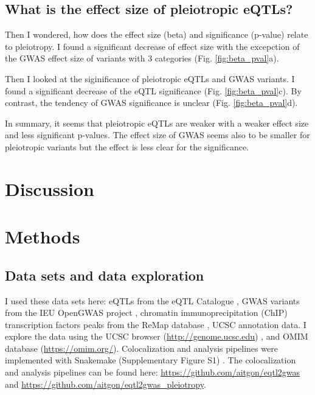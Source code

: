 
\subsection*{What is the effect size of pleiotropic eQTLs?}

Then I wondered, how does the effect size (beta) and significance (p-value) relate to pleiotropy.
%
I found a significant decrease of effect size with the excepction of the GWAS effect size of variants with 3 categories (Fig. \ref{fig:beta_pval}a).

Then I looked at the siginificance of pleiotropic eQTLs and GWAS variants.
%
I found a significant decrease of the eQTL significance (Fig. \ref{fig:beta_pval}c).
%
By contrast, the tendency of GWAS significance is unclear (Fig. \ref{fig:beta_pval}d).

In summary, it seems that pleiotropic eQTLs are weaker with a weaker effect size and less significant p-values.
%
The effect size of GWAS seems also to be smaller for pleiotropic variants but the effect is less clear for the significance.

\section*{Discussion}

\section*{Methods}\label{sec:methods}

\subsection*{Data sets and data exploration}

I used these data sets here: eQTLs from the eQTL Catalogue \citep{2021.Alasoo.Kerimov}, GWAS variants from the IEU OpenGWAS project \citep{2021.Marcora.Lyon}, chromatin immunoprecipitation (ChIP)	transcription factors peaks from the ReMap database \citep{2021.Ballester.Hammal}, UCSC annotation data.
%
I explore the data using the UCSC browser (\url{http://genome.ucsc.edu}) \citep{2021.Kent.Lee}, and OMIM database (\url{https://omim.org/}).
%
Colocalization and analysis pipelines were implemented with Snakemake (Supplementary Figure S1) .
%
The colocalization and analysis pipelines can be found here: \url{https://github.com/aitgon/eqtl2gwas} and \url{https://github.com/aitgon/eqtl2gwas_pleiotropy}.

